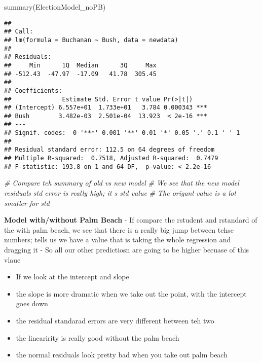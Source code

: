 \documentclass[
]{article}
\newenvironment{Shaded}{\begin{snugshade}}{\end{snugshade}}
\newcommand{\CommentTok}[1]{\textcolor[rgb]{0.56,0.35,0.01}{\textit{#1}}}
\newcommand{\FunctionTok}[1]{\textcolor[rgb]{0.00,0.00,0.00}{#1}}
\newcommand{\NormalTok}[1]{#1}
\providecommand{\tightlist}{%
  \setlength{\itemsep}{0pt}\setlength{\parskip}{0pt}}
\begin{document}
\begin{Shaded}
\begin{Highlighting}[]
\FunctionTok{summary}\NormalTok{(ElectionModel\_noPB)}
\end{Highlighting}
\end{Shaded}

\begin{verbatim}
## 
## Call:
## lm(formula = Buchanan ~ Bush, data = newdata)
## 
## Residuals:
##     Min      1Q  Median      3Q     Max 
## -512.43  -47.97  -17.09   41.78  305.45 
## 
## Coefficients:
##              Estimate Std. Error t value Pr(>|t|)    
## (Intercept) 6.557e+01  1.733e+01   3.784 0.000343 ***
## Bush        3.482e-03  2.501e-04  13.923  < 2e-16 ***
## ---
## Signif. codes:  0 '***' 0.001 '**' 0.01 '*' 0.05 '.' 0.1 ' ' 1
## 
## Residual standard error: 112.5 on 64 degrees of freedom
## Multiple R-squared:  0.7518, Adjusted R-squared:  0.7479 
## F-statistic: 193.8 on 1 and 64 DF,  p-value: < 2.2e-16
\end{verbatim}

\begin{Shaded}
\begin{Highlighting}[]
\CommentTok{\# Compare teh summary of old vs new model }
\CommentTok{\# We see that the new model residuals std error is really high; it s std value }
\CommentTok{\# The origanl value is a lot smaller for std}
\end{Highlighting}
\end{Shaded}

\textbf{Model with/without Palm Beach} - If compare the rstudent and
rstandard of the with palm beach, we see that there is a really big jump
between tehse numbers; tells us we have a value that is taking the whole
regression and dragging it - So all our other predictiosn are going to
be higher becuase of this vlaue

\begin{itemize}
\tightlist
\item
  If we look at the intercept and slope
\item
  the slope is more dramatic when we take out the point, with the
  intercept goes down
\item
  the residual standarad errors are very different between teh two
\item
  the linearirity is really good without the palm beach
\item
  the normal residuals look pretty bad when you take out palm beach
\end{itemize}
\end{document}

